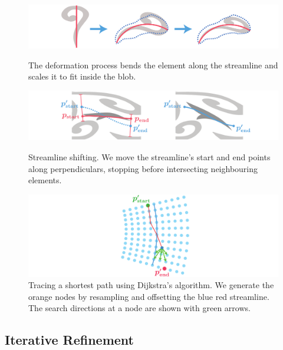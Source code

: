 \begin{figure}[h!]
\centering
\includegraphics[width=1.0\textwidth]{figures/flowpak/shape_deformation.pdf}
\caption[Shape deformation]
{\label{shape_deformation}
The deformation process bends the element along the streamline and
scales it to fit inside the blob.}
\bigskip
 \includegraphics[width=1.0\textwidth]{figures/flowpak/shift_streamline.pdf}
 \caption[Shift a streamline]
 {\label{shift_streamline}
 Streamline shifting.
 	We move the streamline's start and end points along 
	perpendiculars, stopping before intersecting neighbouring elements.}
\smallskip
\includegraphics[width=1.0\textwidth]{figures/flowpak/dijkstra.pdf}
 \caption[Trace a shortest path]
 {\label{dijkstra}
 Tracing a shortest path using Dijkstra's algorithm.  We generate the 
 orange nodes by resampling and offsetting the blue red streamline.
          The search directions at a node are shown with green arrows.}
\end{figure}

\subsection{Iterative Refinement}
\label{flowpak_iterative_refinement}

